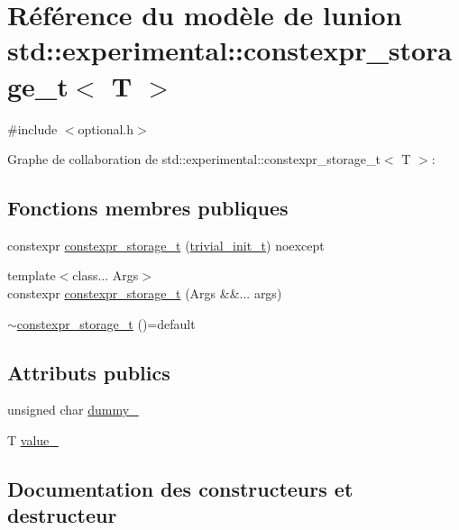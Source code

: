 \hypertarget{unionstd_1_1experimental_1_1constexpr__storage__t}{}\section{Référence du modèle de l\textquotesingle{}union std\+:\+:experimental\+:\+:constexpr\+\_\+storage\+\_\+t$<$ T $>$}
\label{unionstd_1_1experimental_1_1constexpr__storage__t}


{\ttfamily \#include $<$optional.\+h$>$}



Graphe de collaboration de std\+:\+:experimental\+:\+:constexpr\+\_\+storage\+\_\+t$<$ T $>$\+:
\subsection*{Fonctions membres publiques}
\begin{DoxyCompactItemize}
\item 
constexpr \hyperlink{unionstd_1_1experimental_1_1constexpr__storage__t_a453f1fc4d9790ed1a15175a9c13fe517}{constexpr\+\_\+storage\+\_\+t} (\hyperlink{structstd_1_1experimental_1_1trivial__init__t}{trivial\+\_\+init\+\_\+t}) noexcept
\item 
{\footnotesize template$<$class... Args$>$ }\\constexpr \hyperlink{unionstd_1_1experimental_1_1constexpr__storage__t_a643de5b95dac28e87811c7ff4890cd19}{constexpr\+\_\+storage\+\_\+t} (Args \&\&... args)
\item 
\hyperlink{unionstd_1_1experimental_1_1constexpr__storage__t_a91464aa4649be3df9952707782a58a6d}{$\sim$constexpr\+\_\+storage\+\_\+t} ()=default
\end{DoxyCompactItemize}
\subsection*{Attributs publics}
\begin{DoxyCompactItemize}
\item 
unsigned char \hyperlink{unionstd_1_1experimental_1_1constexpr__storage__t_abab3e99e25b519d05a2b32c3748cf759}{dummy\+\_\+}
\item 
T \hyperlink{unionstd_1_1experimental_1_1constexpr__storage__t_ab0f056b5b1e7bfde0dc04629fd0b9ade}{value\+\_\+}
\end{DoxyCompactItemize}


\subsection{Documentation des constructeurs et destructeur}
\mbox{\label{unionstd_1_1experimental_1_1constexpr__storage__t_a453f1fc4d9790ed1a15175a9c13fe517}} 
